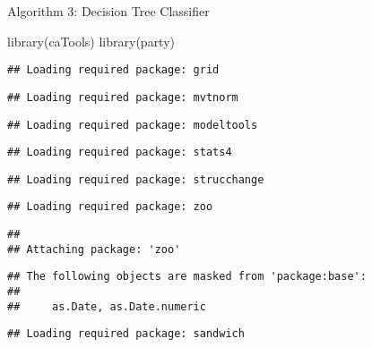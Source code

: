 \documentclass[
]{article}
\newenvironment{Shaded}{\begin{snugshade}}{\end{snugshade}}
\newcommand{\FunctionTok}[1]{\textcolor[rgb]{0.00,0.00,0.00}{#1}}
\newcommand{\NormalTok}[1]{#1}
\begin{document}
Algorithm 3: Decision Tree Classifier

\begin{Shaded}
\begin{Highlighting}[]
\FunctionTok{library}\NormalTok{(caTools)}
\FunctionTok{library}\NormalTok{(party)}
\end{Highlighting}
\end{Shaded}

\begin{verbatim}
## Loading required package: grid
\end{verbatim}

\begin{verbatim}
## Loading required package: mvtnorm
\end{verbatim}

\begin{verbatim}
## Loading required package: modeltools
\end{verbatim}

\begin{verbatim}
## Loading required package: stats4
\end{verbatim}

\begin{verbatim}
## Loading required package: strucchange
\end{verbatim}

\begin{verbatim}
## Loading required package: zoo
\end{verbatim}

\begin{verbatim}
## 
## Attaching package: 'zoo'
\end{verbatim}

\begin{verbatim}
## The following objects are masked from 'package:base':
## 
##     as.Date, as.Date.numeric
\end{verbatim}

\begin{verbatim}
## Loading required package: sandwich
\end{verbatim}
\end{document}
